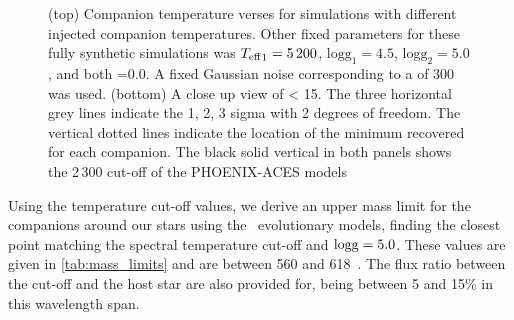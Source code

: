 \begin{figure}
    \centering
    \caption{(top) Companion temperature verses \textchisquared{} for simulations with different injected companion temperatures.
Other fixed parameters for these fully synthetic simulations was \({T_{\mathrm{eff}}}_{1}=5\,200\)\K{}, \(\textrm{logg}_1=4.5\), \(\textrm{logg}_2=5.0\), and both \feh{}=0.0.
A fixed Gaussian noise corresponding to a \snr{} of 300 was used.
       (bottom) A close up view of \textchisquared{} < 15.
The three horizontal grey lines indicate the 1, 2, 3 sigma with 2 degrees of freedom.
The vertical dotted lines indicate the location of the minimum \textchisquared{} recovered for each companion.
The black solid vertical in both panels shows the 2\,300\K{} cut-off of the {PHOENIX-ACES} models}
    \label{fig:injection_shape}
\end{figure}




Using the temperature cut-off values, we derive an upper mass limit for the companions around our stars using the~\citet{baraffe_new_2015} evolutionary models, finding the closest point matching the spectral temperature cut-off and \(\textrm{logg}{}=5.0\).
These values are given in \cref{tab:mass_limits} and are between 560 and 618~\Mjup{}.
The flux ratio between the cut-off and the host star are also provided for, being between 5 and 15\% in this wavelength span.







